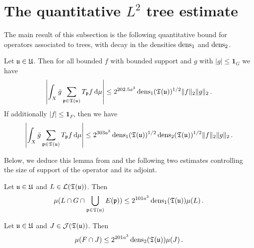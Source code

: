 \section{The quantitative \texorpdfstring{$L^2$}{L2} tree estimate}

The main result of this subsection is the following quantitative bound for operators associated to trees, with decay in the densities $\operatorname{\operatorname{dens}}_1$ and $\operatorname{\operatorname{dens}}_2$.

\begin{lemma}
    \label{densities-tree-bound}
    \leanok
    Let ${\mathfrak u} \in {\mathfrak U}$. Then for all bounded $f$ with bounded support and $g$ with $|g| \le \mathbf{1}_G$
    we have
    \begin{equation}
        \label{eq-cor-tree-est}
        \left|\int_X \bar g \sum_{{\mathfrak p} \in {\mathfrak T}({\mathfrak u})} T_{{\mathfrak p} }f \, \mathrm{d}\mu \right| \le 2^{202.5a^3} \operatorname{\operatorname{dens}}_1({\mathfrak T}({\mathfrak u}))^{1/2} \|f\|_2\|g\|_2\,.
    \end{equation}
    If additionally $|f| \le \mathbf{1}_F$, then we have
    \begin{equation}
        \label{eq-cor-tree-est-F}
        \left| \int_X \bar g \sum_{{\mathfrak p} \in {\mathfrak T}({\mathfrak u})} T_{{\mathfrak p} }f\, \mathrm{d}\mu \right| \le 2^{303a^3} \operatorname{\operatorname{dens}}_1({\mathfrak T}({\mathfrak u}))^{1/2} \operatorname{\operatorname{dens}}_2({\mathfrak T}({\mathfrak u}))^{1/2} \|f\|_2\|g\|_2\,.
    \end{equation}
\end{lemma}

Below, we deduce this lemma from  and the following two estimates controlling the size of support of the operator and its adjoint.

\begin{lemma}
    \label{local-dens1-tree-bound}
    \leanok
    Let ${\mathfrak u} \in {\mathfrak U}$ and $L \in \mathcal{L}({\mathfrak T}({\mathfrak u}))$. Then
    \begin{equation}
    \label{eq-1density-estimate-tree}
        \mu(L \cap G \cap \bigcup_{{\mathfrak p} \in {\mathfrak T}({\mathfrak u})} E({\mathfrak p})) \le 2^{101a^3} \operatorname{\operatorname{dens}}_1({\mathfrak T}({\mathfrak u})) \mu(L)\,.
    \end{equation}
\end{lemma}

\begin{lemma}
    \label{local-dens2-tree-bound}
    \leanok
    Let ${\mathfrak u} \in {\mathfrak U}$ and $J \in \mathcal{J}({\mathfrak T}({\mathfrak u}))$. Then
    $$
        \mu(F \cap J) \le 2^{201a^3} \operatorname{\operatorname{dens}}_2({\mathfrak T}({\mathfrak u})) \mu(J)\,.
    $$
\end{lemma}

